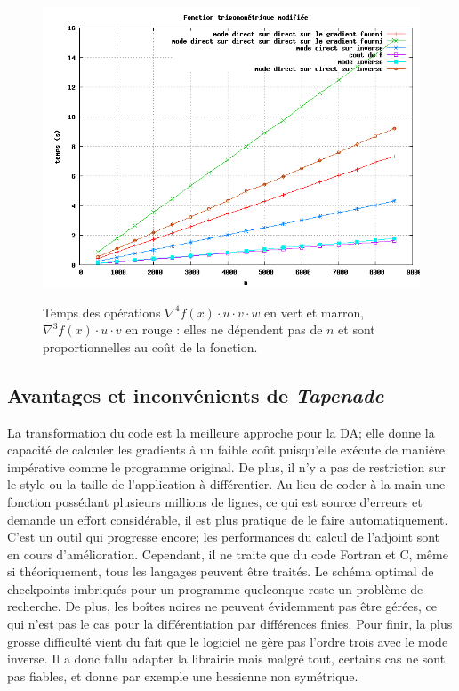 \begin{figure}
\caption{Temps des op\'erations  $\nabla^4f(x)\cdot u \cdot v \cdot w$ en vert et marron, $\nabla^3 f(x)\cdot u \cdot v$ en rouge : elles ne d\'ependent pas de $n$
et sont proportionnelles au coût de la fonction.}
\center
\includegraphics[scale=0.4]{figures/temps17.png}
\label{fig:temps17}
\end{figure}



    \subsection{Avantages et inconv\'enients de {\it Tapenade}}

La transformation du code est la meilleure approche pour la DA; elle donne la capacit\'e de calculer les gradients
\`a un faible coût puisqu'elle ex\'ecute de mani\`ere imp\'erative comme le programme original. De plus, il n'y a pas 
de restriction sur le style ou la taille de l'application \`a diff\'erentier. Au lieu de coder \`a la main une fonction
poss\'edant plusieurs millions de lignes, ce qui est source d'erreurs et demande un effort consid\'erable, il est plus pratique 
de le faire automatiquement. C'est un outil qui progresse encore; les performances du calcul de l'adjoint sont en cours 
d'am\'elioration.
Cependant, il ne traite que du code Fortran et C, même si th\'eoriquement, tous les langages peuvent être trait\'es. Le
sch\'ema optimal de checkpoints imbriqu\'es pour un programme quelconque reste un probl\`eme de recherche.
De plus, les boîtes noires ne peuvent \'evidemment pas être g\'er\'ees, ce qui n'est pas le cas pour la diff\'erentiation par diff\'erences
finies. Pour finir, la plus grosse difficult\'e vient du fait que le logiciel ne g\`ere pas l'ordre trois avec le mode inverse. Il a donc
fallu adapter la librairie mais malgr\'e tout, certains cas ne sont pas fiables, et donne par exemple une hessienne non sym\'etrique.




